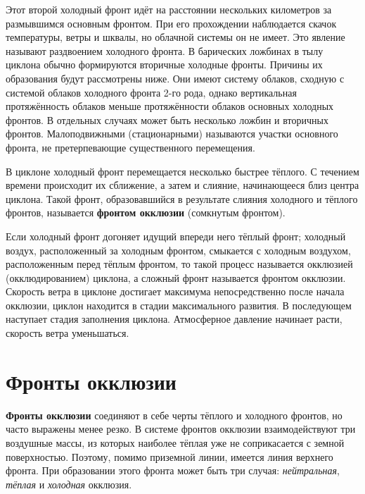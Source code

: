 \documentclass[a4paper, 12pt, twoside, final, book, russian, fittopage, cyremdash, openright]{ncc}
\begin{document}
Этот второй холодный фронт идёт на расстоянии нескольких километров за
размывшимся основным фронтом. При его прохождении наблюдается скачок
температуры, ветры и шквалы, но облачной системы он не имеет. Это
явление называют раздвоением холодного фронта.  В барических ложбинах
в тылу циклона обычно формируются вторичные холодные фронты. Причины
их образования будут рассмотрены ниже. Они имеют систему облаков,
сходную с системой облаков холодного фронта 2-го рода, однако
вертикальная протяжённость облаков меньше протяжённости облаков
основных холодных фронтов. В отдельных случаях может быть несколько
ложбин и вторичных фронтов.  Малоподвижными (стационарными) называются
участки основного фронта, не претерпевающие существенного
перемещения.

В циклоне холодный фронт перемещается несколько быстрее тёплого. С
течением времени происходит их сближение, а затем и слияние,
начинающееся близ центра циклона. Такой фронт, образовавшийся в
результате слияния холодного и тёплого фронтов, называется
\textbf{фронтом окклюзии} (сомкнутым
фронтом).

Если холодный фронт догоняет идущий впереди него тёплый фронт;
холодный воздух, расположенный за холодным фронтом, смыкается с
холодным воздухом, расположенным перед тёплым фронтом, то такой
процесс называется окклюзией (окклюдированием) циклона, а сложный
фронт называется фронтом окклюзии. Скорость ветра в циклоне достигает
максимума непосредственно после начала окклюзии, циклон находится в
стадии максимального развития. В последующем наступает стадия
заполнения циклона. Атмосферное давление начинает расти, скорость
ветра уменьшаться.

\section{Фронты окклюзии}
\label{sec:ocl_front}

\textbf{Фронты окклюзии} соединяют в себе черты
тёплого и холодного фронтов, но часто выражены менее резко.  В системе
фронтов окклюзии взаимодействуют три воздушные массы, из которых
наиболее тёплая уже не соприкасается с земной поверхностью. Поэтому,
помимо приземной линии, имеется линия верхнего фронта. При
образовании этого фронта может быть три случая:
\textit{нейтральная},
\textit{тёплая} и
\textit{холодная} окклюзия.
\end{document}

